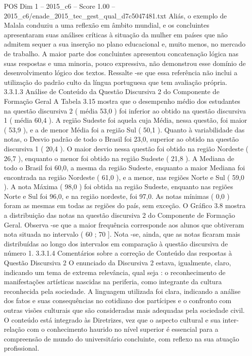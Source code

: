 \begin{textsample}{POS Dim 1 – 2015\_c6 – Score 1.00 – 2015\_c6/enade\_2015\_tec\_gest\_qual\_d7c5047481.txt}
Aliás, o exemplo de Malala conduziu a uma reflexão em âmbito mundial, e os concluintes apresentaram suas análises críticas à situação da mulher em países que não admitem sequer a sua inserção no plano educacional e, muito menos, no mercado de trabalho.
A maior parte dos concluintes apresentou concatenação lógica nas suas respostas e uma minoria, pouco expressiva, não demonstrou esse domínio de desenvolvimento lógico dos textos.
Ressalte -se que essa referência não inclui a utilização do padrão culto da língua portuguesa que tem avaliação própria. 3.3.1.3 Análise de Conteúdo da Questão Discursiva 2 do Componente de Formação Geral A Tabela 3.15 mostra que o desempenho médio dos estudantes na questão discursiva 2 ( média 53,0 ) foi inferior ao obtido na questão discursiva 1 ( média 60,4 ).
A região Sudeste foi aquela cuja Média, nessa questão, foi maior ( 53,9 ), e a de menor Média foi a região Sul ( 50,1 ).
Quanto à variabilidade das notas, o Desvio padrão de todo o Brasil foi 23,0, superior ao obtido na questão discursiva 1 ( 20,4 ).
O maior desvio nessa questão foi obtido na região Nordeste ( 26,7 ), enquanto o menor foi obtido na região Sudeste ( 21,8 ).
A Mediana de todo o Brasil foi 60,0, a mesma da região Sudeste, enquanto a maior Mediana foi encontrada na região Nordeste ( 61,0 ), e a menor, nas regiões Norte e Sul ( 59,0 ).
A nota Máxima ( 98,0 ) foi obtida na região Sudeste, enquanto nas regiões Norte e Sul foi 96,0, e na região nordeste, foi 97,0.
As notas mínimas ( 0,0 ) foram as mesmas em todas as regiões do país, sem exceção.
O Gráfico 3.8 mostra a distribuição das notas na questão discursiva 2 do Componente de Formação Geral.
Observa -se que a maior frequência corresponde aos alunos que obtiveram nota situada no intervalo ( 60 ; 70 ].
Nota -se, ainda, que as notas ficaram mais distribuídas ao longo dos intervalos em comparação à questão discursiva de número 1. 3.3.1.4 Comentários sobre a correção de Conteúdo das respostas à Questão Discursiva 2 O enunciado da Discursiva 2 estava, igualmente, claro, indicando um tema de extrema relevância, qual seja : o reconhecimento de manifestações artísticas nascidas na periferia, como integrante da cultura reconhecida pela sociedade.
A linguagem utilizada foi clara, indicando a análise dos fatos e suas consequências no cotidiano dos partícipes e o confronto com outras visões culturais que são consideradas mais adequadas pela sociedade civil.
O conteúdo está integrado às Diretrizes, vez que o aspecto cultural e sua inter-relação com o conhecimento haurido no nível superior é essencial para a compreensão de mundo do universitário concluinte, com reflexo na sua atuação profissional.

\end{textsample}
